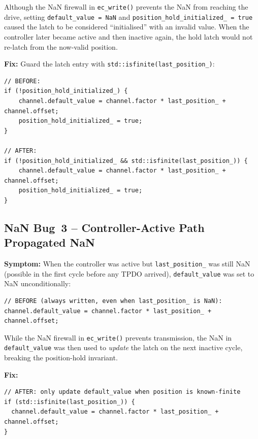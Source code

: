 \documentclass[11pt,a4paper]{article}
\begin{document}
Although the NaN firewall in \texttt{ec\_write()} prevents the NaN from
reaching the drive, setting \texttt{default\_value = NaN} and
\texttt{position\_hold\_initialized\_ = true} caused the latch to be
considered ``initialised'' with an invalid value.  When the controller later
became active and then inactive again, the hold latch would not re-latch
from the now-valid position.

\textbf{Fix:} Guard the latch entry with \texttt{std::isfinite(last\_position\_)}:

\begin{lstlisting}[caption={NaN Bug~2: finite guard on position-hold latch}]
// BEFORE:
if (!position_hold_initialized_) {
    channel.default_value = channel.factor * last_position_ + channel.offset;
    position_hold_initialized_ = true;
}

// AFTER:
if (!position_hold_initialized_ && std::isfinite(last_position_)) {
    channel.default_value = channel.factor * last_position_ + channel.offset;
    position_hold_initialized_ = true;
}
\end{lstlisting}

\subsection{NaN Bug~3 -- Controller-Active Path Propagated NaN}
\label{sec:nan3}

\textbf{Symptom:} When the controller was active but \texttt{last\_position\_}
was still NaN (possible in the first cycle before any TPDO arrived),
\texttt{default\_value} was set to NaN unconditionally:

\begin{lstlisting}[caption={NaN Bug~3: unguarded assignment in controller-active path}]
// BEFORE (always written, even when last_position_ is NaN):
channel.default_value = channel.factor * last_position_ + channel.offset;
\end{lstlisting}

While the NaN firewall in \texttt{ec\_write()} prevents transmission, the
NaN in \texttt{default\_value} was then used to \emph{update} the latch on
the next inactive cycle, breaking the position-hold invariant.

\textbf{Fix:}
\begin{lstlisting}[caption={NaN Bug~3: finite guard on controller-active path}]
// AFTER: only update default_value when position is known-finite
if (std::isfinite(last_position_)) {
  channel.default_value = channel.factor * last_position_ + channel.offset;
}
\end{lstlisting}
\end{document}
